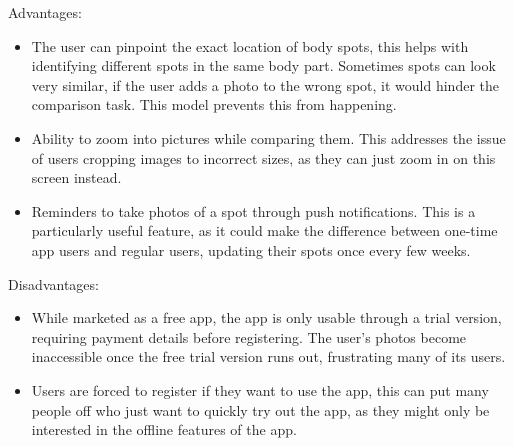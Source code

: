 Advantages:
\begin{itemize}
    \item The user can pinpoint the exact location of body spots, this helps with identifying different spots in the same body part. Sometimes spots can look very similar, if the user adds a photo to the wrong spot, it would hinder the comparison task. This model prevents this from happening.
    \item Ability to zoom into pictures while comparing them. This addresses the issue of users cropping images to incorrect sizes, as they can just zoom in on this screen instead.
    \item Reminders to take photos of a spot through push notifications. This is a particularly useful feature, as it could make the difference between one-time app users and regular users, updating their spots once every few weeks.
\end{itemize}

Disadvantages:
\begin{itemize}
    \item While marketed as a free app, the app is only usable through a trial version, requiring payment details before registering. The user's photos become inaccessible once the free trial version runs out, frustrating many of its users.
    \item Users are forced to register if they want to use the app, this can put many people off who just want to quickly try out the app, as they might only be interested in the offline features of the app.
\end{itemize}

